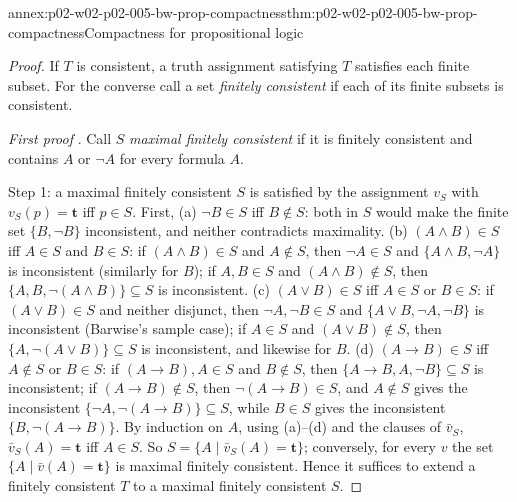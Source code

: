 \begin{annexitem}{annex:p02-w02-p02-005-bw-prop-compactness}{thm:p02-w02-p02-005-bw-prop-compactness}{Compactness for propositional logic}
\begin{proof}
If \(T\) is consistent, a truth assignment satisfying \(T\) satisfies each
finite subset.  For the converse call a set \emph{finitely consistent} if
each of its finite subsets is consistent.

\emph{First proof} \cite[ch.~A.1, \S4, pp.~26--27]{Barwise1977FirstOrder}.
Call \(S\) \emph{maximal finitely consistent} if it is finitely consistent
and contains \(A\) or \(\neg A\) for every formula \(A\).

Step 1: a maximal finitely consistent \(S\) is satisfied by the assignment
\(v_S\) with \(v_S(p)=\mathbf t\) iff \(p\in S\).  First,
(a) \(\neg B\in S\) iff \(B\notin S\): both in \(S\) would make the finite
set \(\{B,\neg B\}\) inconsistent, and neither contradicts maximality.
(b) \((A\land B)\in S\) iff \(A\in S\) and \(B\in S\): if
\((A\land B)\in S\) and \(A\notin S\), then \(\neg A\in S\) and
\(\{A\land B,\neg A\}\) is inconsistent (similarly for \(B\)); if
\(A,B\in S\) and \((A\land B)\notin S\), then \(\{A,B,\neg(A\land B)\}\subseteq S\)
is inconsistent.  (c) \((A\lor B)\in S\) iff \(A\in S\) or \(B\in S\): if
\((A\lor B)\in S\) and neither disjunct, then \(\neg A,\neg B\in S\) and
\(\{A\lor B,\neg A,\neg B\}\) is inconsistent (Barwise's sample case); if
\(A\in S\) and \((A\lor B)\notin S\), then \(\{A,\neg(A\lor B)\}\subseteq S\)
is inconsistent, and likewise for \(B\).  (d) \((A\to B)\in S\) iff
\(A\notin S\) or \(B\in S\): if \((A\to B),A\in S\) and \(B\notin S\), then
\(\{A\to B,A,\neg B\}\subseteq S\) is inconsistent; if \((A\to B)\notin S\),
then \(\neg(A\to B)\in S\), and \(A\notin S\) gives the inconsistent
\(\{\neg A,\neg(A\to B)\}\subseteq S\), while \(B\in S\) gives the
inconsistent \(\{B,\neg(A\to B)\}\).  By induction on \(A\), using
(a)--(d) and the clauses of \(\bar v_S\),
\(\bar v_S(A)=\mathbf t\) iff \(A\in S\).  So \(S=\{A\mid\bar v_S(A)=\mathbf t\}\);
conversely, for every \(v\) the set \(\{A\mid\bar v(A)=\mathbf t\}\) is
maximal finitely consistent.  Hence it suffices to extend a finitely
consistent \(T\) to a maximal finitely consistent \(S\).


\end{proof}
\end{annexitem}
